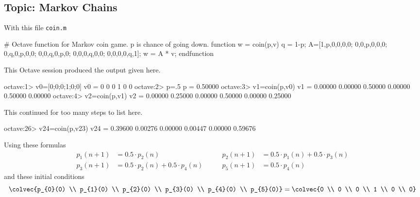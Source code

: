 \subsection{Topic: Markov Chains}
\begin{ans}{1}
      \begin{exparts}
        \partsitem With this file \texttt{coin.m}
\begin{computercode}
# Octave function for Markov coin game.  p is chance of going down.
function w = coin(p,v)
  q = 1-p;
  A=[1,p,0,0,0,0;
     0,0,p,0,0,0;
     0,q,0,p,0,0;
     0,0,q,0,p,0;
     0,0,0,q,0,0;
     0,0,0,0,q,1];
  w = A * v;
endfunction
\end{computercode}
         This Octave session produced the output given here.
\begin{computercode}
octave:1> v0=[0;0;0;1;0;0]
v0 =
  0
  0
  0
  1
  0
  0
octave:2> p=.5
p = 0.50000
octave:3> v1=coin(p,v0)
v1 =
  0.00000
  0.00000
  0.50000
  0.00000
  0.50000
  0.00000
octave:4> v2=coin(p,v1)
v2 =
  0.00000
  0.25000
  0.00000
  0.50000
  0.00000
  0.25000
\end{computercode}
This continued for too many steps to list here.
\begin{computercode}
octave:26> v24=coin(p,v23)
v24 =
  0.39600
  0.00276
  0.00000
  0.00447
  0.00000
  0.59676
\end{computercode}
        \partsitem Using these formulas
          \begin{alignat*}{2}
             p_{1}(n+1) &= 0.5\cdot p_{2}(n)
             &\qquad
             p_{2}(n+1) &= 0.5\cdot p_{1}(n)+0.5\cdot p_{3}(n)
                                                              \\
             p_{3}(n+1) &= 0.5\cdot p_{2}(n)+0.5\cdot p_{4}(n)
             &\qquad
             p_{5}(n+1) &= 0.5\cdot p_{4}(n)
          \end{alignat*}
          and these initial conditions
          \begin{equation*}
            \colvec{p_{0}(0) \\ p_{1}(0) \\ p_{2}(0) \\ p_{3}(0) \\
                        p_{4}(0) \\ p_{5}(0)}
            =
            \colvec{0 \\ 0 \\ 0 \\ 1 \\
                        0 \\ 0}

\end{equation*}
\end{exparts}
\end{ans}
